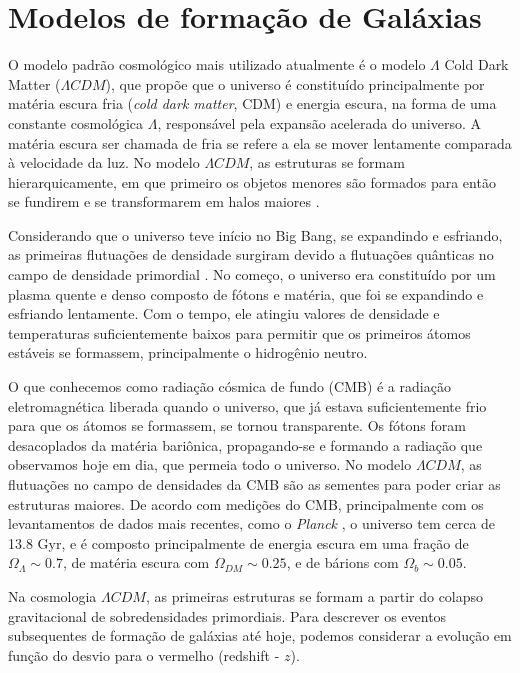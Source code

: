 \section{Modelos de formação de Galáxias}\label{subsec:modelo_formacao_galaxias}

O modelo padrão cosmológico mais utilizado atualmente é o modelo $\Lambda$ Cold Dark Matter ($\Lambda CDM$), que propõe que o universo é constituído principalmente por matéria escura fria ({\it cold dark matter}, CDM) e energia escura, na forma de uma constante cosmológica $\Lambda$, responsável pela expansão acelerada do universo. A matéria escura ser chamada de fria se refere a ela se mover lentamente comparada à velocidade da luz. No modelo $\Lambda CDM$, as estruturas se formam hierarquicamente, em que primeiro os objetos menores são formados para então se fundirem e se transformarem em halos maiores \citep{Blumenthal_1984}.

Considerando que o universo teve início no Big Bang, se expandindo e esfriando, as primeiras flutuações de densidade surgiram devido a flutuações quânticas no campo de densidade primordial \citep{liddle_1999}. No começo, o universo era constituído por um plasma quente e denso composto de fótons e matéria, que foi se expandindo e esfriando lentamente. Com o tempo, ele atingiu valores de densidade e temperaturas suficientemente baixos para permitir que os primeiros átomos estáveis se formassem, principalmente o hidrogênio neutro.

O que conhecemos como radiação cósmica de fundo (CMB) é a radiação eletromagnética liberada quando o universo, que já estava suficientemente frio para que os átomos se formassem, se tornou transparente. Os fótons foram desacoplados da matéria bariônica, propagando-se e formando a radiação que observamos hoje em dia, que permeia todo o universo. No modelo $\Lambda CDM$, as flutuações no campo de densidades da CMB são as sementes para poder criar as estruturas maiores. De acordo com medições do CMB, principalmente com os levantamentos de dados mais recentes, como o \textit{Planck} \citep{Planck_2020}, o universo tem cerca de 13.8 Gyr, e é composto principalmente de energia escura em uma fração de $\Omega_\Lambda \sim 0.7$, de matéria escura com $\Omega_{DM} \sim 0.25$, e de bárions com $\Omega_b \sim 0.05$.

Na cosmologia $\Lambda CDM$, as primeiras estruturas se formam a partir do colapso gravitacional de sobredensidades primordiais. Para descrever os eventos subsequentes de formação de galáxias até hoje, podemos considerar a evolução em função do desvio para o vermelho (redshift - $z$).

